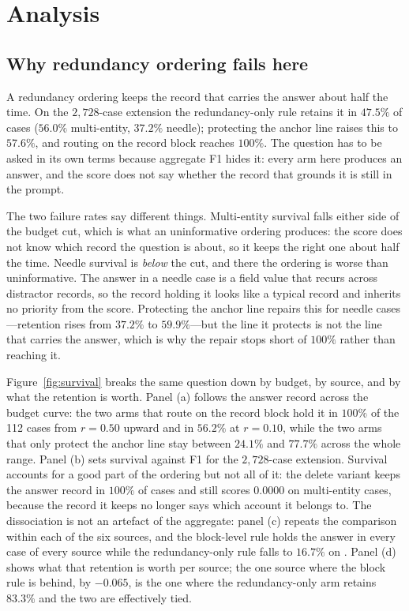 \section{Analysis}
\label{sec:analysis}



\subsection{Why redundancy ordering fails here}
A redundancy ordering keeps the record that carries the answer about half the time. On the
$2{,}728$-case extension the redundancy-only rule retains it in $47.5\%$ of cases ($56.0\%$
multi-entity, $37.2\%$ needle); protecting the anchor line raises this to $57.6\%$, and
routing on the record block reaches $100\%$. The question has to be asked in its own terms
because aggregate F1 hides it: every arm here produces an answer, and the score does not say
whether the record that grounds it is still in the prompt.

The two failure rates say different things. Multi-entity survival falls either side of the
budget cut, which is what an uninformative ordering produces: the score does not know which
record the question is about, so it keeps the right one about half the time. Needle survival
is \emph{below} the cut, and there the ordering is worse than uninformative. The answer in a
needle case is a field value that recurs across distractor records, so the record holding it
looks like a typical record and inherits no priority from the score. Protecting the anchor
line repairs this for needle cases---retention rises from $37.2\%$ to $59.9\%$---but the line
it protects is not the line that carries the answer, which is why the repair stops short of
$100\%$ rather than reaching it.

Figure~\ref{fig:survival} breaks the same question down by budget, by source, and by what the
retention is worth. Panel (a) follows the answer record across the budget curve: the two arms
that route on the record block hold it in $100\%$ of the 112 cases from $r=0.50$ upward and in
$56.2\%$ at $r=0.10$, while the two arms that only protect the anchor line stay between
$24.1\%$ and $77.7\%$ across the whole range. Panel (b) sets survival against F1 for the
$2{,}728$-case extension. Survival accounts for a good part of the ordering but not all of it:
the delete variant keeps the answer record in $100\%$ of cases and still scores $0.0000$ on
multi-entity cases, because the record it keeps no longer says which account it belongs to. The
dissociation is not an artefact of the aggregate: panel (c) repeats the comparison within each
of the six sources, and the block-level rule holds the answer in every case of every source
while the redundancy-only rule falls to $16.7\%$ on . Panel (d) shows what
that retention is worth per source; the one source where the block rule is behind, by
$-0.065$, is the one where the redundancy-only arm retains $83.3\%$ and the two are
effectively tied.




